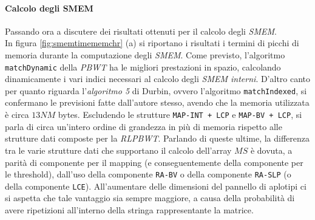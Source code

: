 \paragraph{Calcolo degli SMEM}
Passando ora a discutere dei risultati ottenuti per il calcolo degli
\textit{SMEM}.\\ 
In figura \ref{fig:smemtimememchr} (a) si riportano i risultati i termini di
picchi di 
memoria durante la computazione degli \textit{SMEM}. Come previsto, l'algoritmo
\texttt{matchDynamic} della \textit{PBWT} ha le migliori prestazioni
in spazio, calcolando dinamicamente i vari indici necessari al calcolo degli
\textit{SMEM interni}. D'altro canto per quanto riguarda l'\textit{algoritmo 5}
di Durbin, ovvero l'algoritmo \texttt{matchIndexed}, si confermano le previsioni
fatte dall'autore stesso, avendo che la memoria utilizzata è circa $13NM$
bytes. Escludendo le strutture \texttt{MAP-INT + LCP} e \texttt{MAP-BV + LCP},
si parla di circa un'intero ordine di grandezza in più di memoria rispetto alle
strutture dati composte per la \textit{RLPBWT}. Parlando di queste ultime, la
differenza tra le varie strutture dati che supportano il calcolo 
dell'array $MS$ è dovuta, a parità di componente per il mapping (e
conseguentemente della componente per le threshold), dall'uso della componente
\texttt{RA-BV} o della componente \texttt{RA-SLP} (o della componente
\texttt{LCE}). All'aumentare delle dimensioni del pannello di aplotipi ci si
aspetta che tale vantaggio sia sempre maggiore, a causa della probabilità di
avere ripetizioni all'interno della stringa rappresentante la matrice.\\
